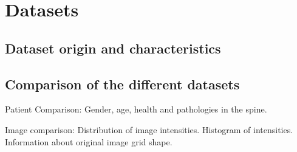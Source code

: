 \chapter{Datasets}

\section{Dataset origin and characteristics}

\section{Comparison of the different datasets}

Patient Comparison: Gender, age, health and pathologies in the spine.

Image comparison: 
Distribution of image intensities. Histogram of intensities.
Information about original image grid shape.